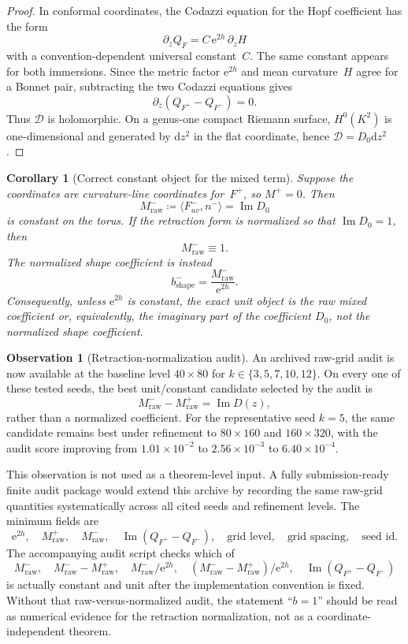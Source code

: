 \documentclass[11pt,a4paper]{article}
\theoremstyle{plain}
\newtheorem{corollary}[theorem]{Corollary}
\theoremstyle{definition}
\newtheorem{observation}[theorem]{Observation}
\theoremstyle{remark}
\DeclareMathOperator{\Imag}{Im}
\newcommand{\dd}{\mathrm{d}}
\newcommand{\ee}{\mathrm{e}}
\begin{document}
\begin{proof}
In conformal coordinates, the Codazzi equation for the Hopf coefficient
has the form
\[
  \partial_{\bar z}Q_F = C\,\ee^{2h}\,\partial_z H
\]
with a convention-dependent universal constant~$C$.  The same constant
appears for both immersions.  Since the metric factor $\ee^{2h}$ and
mean curvature~$H$ agree for a Bonnet pair, subtracting the two Codazzi
equations gives
\[
  \partial_{\bar z}(Q_{F^+}-Q_{F^-})=0.
\]
Thus $\mathcal D$ is holomorphic.  On a genus-one compact Riemann
surface, $H^0(K^2)$ is one-dimensional and generated by $\dd z^2$ in
the flat coordinate, hence $\mathcal D=D_0\dd z^2$.
\end{proof}

\begin{corollary}[Correct constant object for the mixed term]
\label{cor:C2-correct-object}
Suppose the coordinates are curvature-line coordinates for~$F^+$, so
$M^+=0$.  Then
\[
  M^-_{\mathrm{raw}}
  \coloneqq \langle F^-_{uv},n^-\rangle
  = \Imag D_0
\]
is constant on the torus.  If the retraction form is normalized so that
$\Imag D_0=1$, then
\[
  M^-_{\mathrm{raw}}\equiv 1.
\]
The normalized shape coefficient is instead
\[
  b^-_{\mathrm{shape}} = \frac{M^-_{\mathrm{raw}}}{\ee^{2h}}.
\]
Consequently, unless $\ee^{2h}$ is constant, the exact unit object is
the raw mixed coefficient or, equivalently, the imaginary part of the
coefficient $D_0$, not the normalized shape coefficient.
\end{corollary}

\begin{observation}[Retraction-normalization audit]
\label{obs:DeltaII}
\label{obs:C2-normalization-audit}
\label{obs:b-equals-1-audit}
An archived raw-grid audit is now available at the baseline level
$40\times80$ for $k\in\{3,5,7,10,12\}$.  On every one of these tested
seeds, the best unit/constant candidate selected by the audit is
\[
  M^-_{\mathrm{raw}}-M^+_{\mathrm{raw}}
  = \Imag D(z),
\]
rather than a normalized coefficient.  For the representative seed
$k=5$, the same candidate remains best under refinement to
$80\times160$ and $160\times320$, with the audit score improving from
$1.01\times10^{-2}$ to $2.56\times10^{-3}$ to $6.40\times10^{-4}$.

This observation is not used as a theorem-level input.  A fully
submission-ready finite audit package would extend this archive by
recording the same raw-grid quantities systematically across all cited
seeds and refinement levels.  The minimum fields are
\[
  \ee^{2h},\quad M^+_{\mathrm{raw}},\quad M^-_{\mathrm{raw}},\quad
  \Imag(Q_{F^+}-Q_{F^-}),\quad \text{grid level},\quad
  \text{grid spacing},\quad \text{seed id}.
\]
The accompanying audit script checks which of
\[
  M^-_{\mathrm{raw}},\quad
  M^-_{\mathrm{raw}}-M^+_{\mathrm{raw}},\quad
  M^-_{\mathrm{raw}}/\ee^{2h},\quad
  (M^-_{\mathrm{raw}}-M^+_{\mathrm{raw}})/\ee^{2h},\quad
  \Imag(Q_{F^+}-Q_{F^-})
\]
is actually constant and unit after the implementation convention is
fixed.  Without that raw-versus-normalized audit, the statement
``$b=1$'' should be read as numerical evidence for the retraction
normalization, not as a coordinate-independent theorem.
\end{observation}
\end{document}
